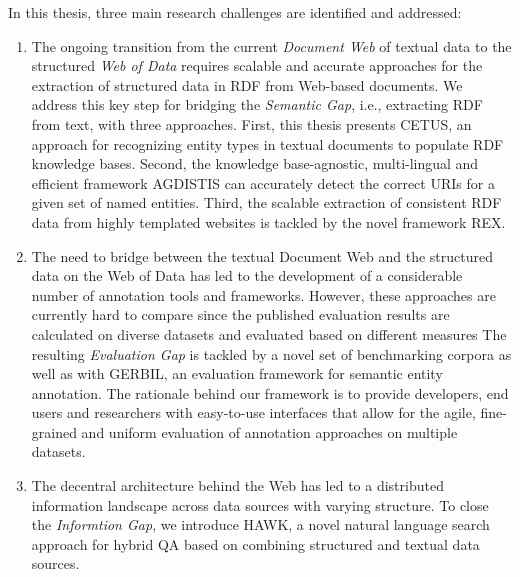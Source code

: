 In this thesis, three main research challenges are identified and addressed:
\begin{enumerate}
\item 
The ongoing transition from the current \emph{Document Web} of textual data to the structured \emph{Web of Data} requires scalable and accurate approaches for the extraction of structured data in \ac{RDF} from Web-based documents.
We address this key step for bridging the \emph{Semantic Gap}, i.e., extracting RDF from text, with three approaches.
First, this thesis presents CETUS, an approach for recognizing entity types in textual documents to populate RDF knowledge bases. 
Second, the knowledge base-agnostic, multi-lingual and efficient framework AGDISTIS can accurately detect the correct URIs for a given set of named entities.
Third, the scalable extraction of consistent \ac{RDF} data from highly templated websites is tackled by the novel framework REX.
\item 
The need to bridge between the textual Document Web and the structured data on the Web of Data has led to the development of a considerable number of annotation tools and frameworks. 
However, these approaches are currently hard to compare since the published evaluation results are calculated on diverse datasets and evaluated based on different measures
The resulting \emph{Evaluation Gap} is tackled by a novel set of benchmarking corpora as well as with GERBIL, an evaluation framework for semantic entity annotation. 
The rationale behind our framework is to provide developers, end users and researchers with easy-to-use interfaces that allow for the agile, fine-grained and uniform evaluation of annotation approaches on multiple datasets.
\item 
The decentral architecture behind the Web has led to a distributed information landscape across data sources with varying structure. 
To close the \emph{Informtion Gap},  we introduce HAWK, a novel natural language search approach for hybrid \ac{QA} based on combining structured and textual data sources.
\end{enumerate}
